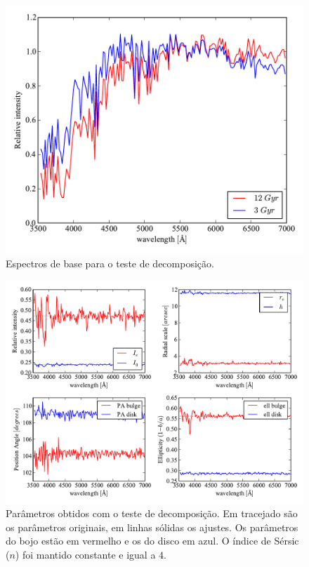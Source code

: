\begin{figure}
	\includegraphics[width=0.7\columnwidth]{figuras/test-spectra}
	\caption[Espectros de base para o teste de decomposição] {Espectros de base
	para o teste de decomposição.}
	\label{fig:testSpectra}
\end{figure}


\begin{figure}
	\includegraphics[width=1.0\columnwidth]{figuras/test-parameters}
	\caption[Parâmetros obtidos com o teste de decomposição] {Parâmetros obtidos
	com o teste de decomposição. Em tracejado são os parâmetros originais, em
	linhas sólidas os ajustes. Os parâmetros do bojo estão em vermelho e os do
	disco em azul. O índice de Sérsic ($n$) foi mantido constante e igual a $4$.}
	\label{fig:testParameters}
\end{figure}


